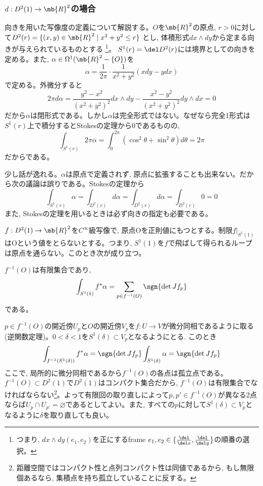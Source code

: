 \subsubsection{$d:D^2(1)\to \mb{R}^2$の場合}
向きを用いた写像度の定義について解説する。$O$を$\mb{R}^2$の原点, $r>0$に対して$D^2(r)=\{  (x,y)\in \mb{R}^2\mid x^2+y^2\leq r\}$ とし, 体積形式$dx\wedge dy$から定まる向きが与えられているものとする
\footnote{つまり, $dx\wedge dy (e_1,e_2)$を正にするframe $e_1,e_2\in \{ \frac{\del}{\del x}, \frac{\del}{\del y} \}$の順番の選択。}。
$S^1(r) = \del D^2(r)$には境界としての向きを定める。また, $\alpha\in \Omega^{1}(\mb{R}^2-\{ O \})$を
\[\alpha = \dfrac{1}{2\pi} \cdot \dfrac{1}{x^2+y^2}(x dy - y dx)\]
で定める。外微分すると
\[2\pi d\alpha = \dfrac{y^2-x^2}{(x^2+y^2)^2}dx\wedge dy - \dfrac{x^2-y^2}{(x^2+y^2)^2}dy\wedge dx = 0\]
だから$\alpha$は閉形式である。しかし$\alpha$は完全形式ではない。なぜなら完全1形式は$S^1(r)$上で積分するとStokesの定理から0であるものの, 
\[\int_{S^1(r)} 2\pi \alpha = \int_{0}^{2\pi} (\cos^2{\theta} + \sin^{2}{\theta})d\theta = 2\pi\]
だからである。
\begin{rem}
少し話が逸れる。$\alpha$は原点で定義されず, 原点に拡張することも出来ない。だから次の議論は誤りである。Stokesの定理から
\[\int_{S^1(r)}\alpha = \int_{D^2(r)} d\alpha = \int_{D^2(r)}d\alpha = \int_{D^2(r)}0 = 0\]
また, Stokesの定理を用いるときは必ず向きの指定も必要である。\bbox
\end{rem}
$f:D^2(1)\to \mb{R}^2$を$C^{\infty}$級写像で, 原点Oを正則値にもつとする。制限$f|_{S^1(1)}$はOという値をとらないとする。つまり, $S^1(1)$を$f$で飛ばして得られるループは原点を通らない。このとき次が成り立つ。
\begin{prop} 
$f^{-1}(O)$は有限集合であり, 
\[\int_{S^1(1)}f^{\ast}\alpha = \sum_{p\in f^{-1}(O)}\sgn{\det Jf_{p}}\]
である。
\end{prop}
\prf $p\in f^{-1}(O)$の開近傍$U_{p}$と$O$の開近傍$V_{p}$を$f:U\to V$が微分同相であるように取る(逆関数定理)。$0<\delta < 1$を$S^{1}(\delta) \subset V_{p}$となるようにとる. このとき
\[\int_{f^{-1}(S^1(\delta))} f^{\ast}\alpha = \sgn{\det{Jf_{p}}} \int_{S^1(\delta)} \alpha =  \sgn{\det{Jf_{p}}}\]
ここで, 局所的に微分同相であるから$f^{-1}(O)$の各点は孤立点である。$f^{-1}(O) \subset D^2(1)$で$D^2(1)$はコンパクト集合だから, $f^{-1}(O)$は有限集合でなければならない\footnote{距離空間ではコンパクト性と点列コンパクト性は同値であるから, もし無限個あるなら, 集積点を持ち孤立していることに反する。}。よって有限回の取り直しによって$p,p'\in f^{-1}(O)$が異なる2点ならば$U_{p}\cap U_{p'} =\varnothing$であるとしてよい。また, すべての$p$に対して$S^1(\delta) \subset V_{p}$となるように$\delta$を取り直しても良い。

